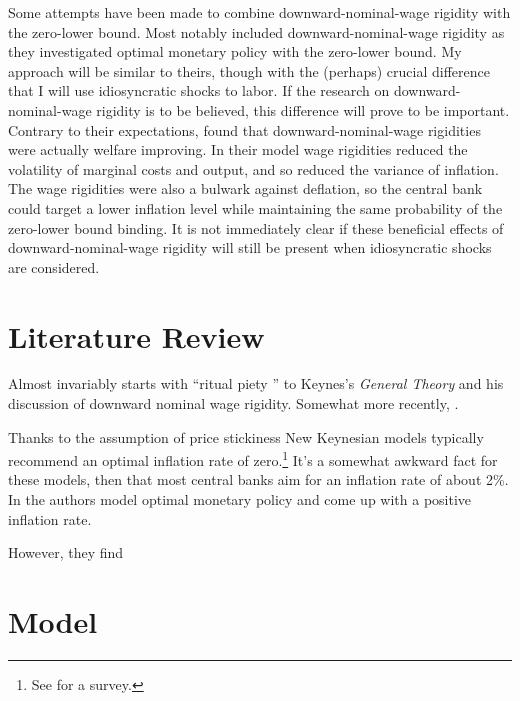 \documentclass[12pt,a4paper]{scrartcl}            %
\begin{document}
Some attempts have been made to combine downward-nominal-wage rigidity with the zero-lower bound.
Most notably \cite{coibon_gorodnichenko_wieland_2012} included downward-nominal-wage rigidity as they investigated optimal monetary policy with the zero-lower bound.
My approach will be similar to theirs, though with the (perhaps) crucial difference that I will use idiosyncratic shocks to labor.
If the research on downward-nominal-wage rigidity is to be believed, this difference will prove to be important.
Contrary to their expectations, \cite{coibon_gorodnichenko_wieland_2012} found that downward-nominal-wage rigidities were actually welfare improving.
In their model wage rigidities reduced the volatility of marginal costs and output, and so reduced the variance of inflation.
The wage rigidities were also a bulwark against deflation, so the central bank could target a lower inflation level while maintaining the same probability of the zero-lower bound binding.
It is not immediately clear if these beneficial effects of downward-nominal-wage rigidity will still be present when idiosyncratic shocks are considered.

\section{Literature Review}
\label{sec:literature_review}

Almost invariably starts with ``ritual piety \citep{tobin_1972}'' to Keynes's \emph{General Theory} and his discussion of downward nominal wage rigidity.
Somewhat more recently, \cite{akerlof_dickens_perry_1996}.


Thanks to the assumption of price stickiness New Keynesian models typically recommend an optimal inflation rate of zero.\footnote{
    See \cite{schmitt-grohe_uribe_2010} for a survey.
}
It's a somewhat awkward fact for these models, then that most central banks aim for an inflation rate of about 2\%.
In \cite{coibon_gorodnichenko_wieland_2012} the authors model optimal monetary policy and come up with a positive inflation rate.

However, they find

\section{Model}
\end{document}
